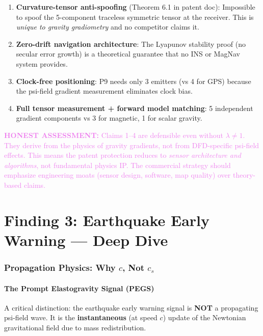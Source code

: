 \documentclass[11pt]{article}
\theoremstyle{definition}
\theoremstyle{remark}
\newcommand{\honest}[1]{\textcolor{violet}{\textbf{HONEST ASSESSMENT:} #1}}
\begin{document}
\begin{enumerate}
  \item \textbf{Curvature-tensor anti-spoofing} (Theorem 6.1 in patent doc):
    Impossible to spoof the 5-component traceless symmetric tensor at the
    receiver. This is \emph{unique to gravity gradiometry} and no competitor
    claims it.
  \item \textbf{Zero-drift navigation architecture}: The Lyapunov stability
    proof (no secular error growth) is a theoretical guarantee that no
    INS or MagNav system provides.
  \item \textbf{Clock-free positioning}: P9 needs only 3 emitters (vs 4 for GPS)
    because the psi-field gradient measurement eliminates clock bias.
  \item \textbf{Full tensor measurement + forward model matching}: 5 independent
    gradient components vs 3 for magnetic, 1 for scalar gravity.
\end{enumerate}

\honest{Claims 1--4 are defensible even without $\lambda \neq 1$. They derive
from the physics of gravity gradients, not from DFD-specific psi-field effects.
This means the patent protection reduces to \emph{sensor architecture and
algorithms}, not fundamental physics IP. The commercial strategy should
emphasize engineering moats (sensor design, software, map quality) over
theory-based claims.}

\part{Finding 3: Earthquake Early Warning --- Deep Dive}
\label{part:eew}

\section{Propagation Physics: Why $c$, Not $c_s$}
\label{sec:propagation}

\subsection{The Prompt Elastogravity Signal (PEGS)}

A critical distinction: the earthquake early warning signal is \textbf{NOT}
a propagating psi-field wave. It is the \textbf{instantaneous} (at speed $c$)
update of the Newtonian gravitational field due to mass redistribution.
\end{document}
